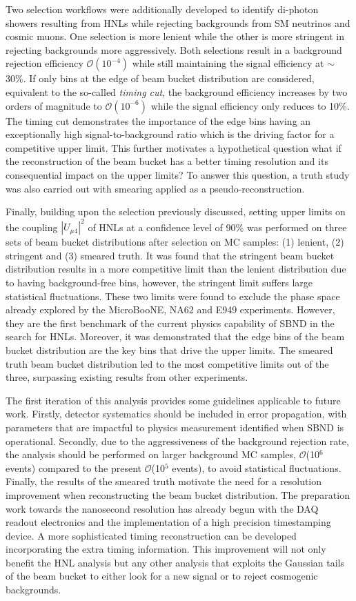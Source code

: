 Two selection workflows were additionally developed to identify di-photon showers resulting from HNLs while rejecting backgrounds from SM neutrinos and cosmic muons.
One selection is more lenient while the other is more stringent in rejecting backgrounds more aggressively.
Both selections result in a background rejection efficiency $\mathcal{O}(10^{-4})$ while still maintaining the signal efficiency at $\sim$30\%.
If only bins at the edge of beam bucket distribution are considered, equivalent to the so-called \textit{timing cut}, the background efficiency increases by two orders of magnitude to $\mathcal{O}(10^{-6})$ while the signal efficiency only reduces to 10\%. 
The timing cut demonstrates the importance of the edge bins having an exceptionally high signal-to-background ratio which is the driving factor for a competitive upper limit.
This further motivates a hypothetical question what if the reconstruction of the beam bucket has a better timing resolution and its consequential impact on the upper limits?
To answer this question, a truth study was also carried out with smearing applied as a pseudo-reconstruction. 

Finally, building upon the selection previously discussed, setting upper limits on the coupling $|U_{\mu4}|^2$ of HNLs at a confidence level of 90\% was performed on three sets of beam bucket distributions after selection on MC samples: (1) lenient, (2) stringent and (3) smeared truth.  
It was found that the stringent beam bucket distribution results in a more competitive limit than the lenient distribution due to having background-free bins, however, the stringent limit suffers large statistical fluctuations.
These two limits were found to exclude the phase space already explored by the MicroBooNE, NA62 and E949 experiments.
However, they are the first benchmark of the current physics capability of SBND in the search for HNLs.
Moreover, it was demonstrated that the edge bins of the beam bucket distribution are the key bins that drive the upper limits.   
The smeared truth beam bucket distribution led to the most competitive limits out of the three, surpassing existing results from other experiments.  

The first iteration of this analysis provides some guidelines applicable to future work.
Firstly, detector systematics should be included in error propagation, with parameters that are impactful to physics measurement identified when SBND is operational.
Secondly, due to the aggressiveness of the background rejection rate, the analysis should be performed on larger background MC samples, $\mathcal{O}$(10$^6$ events) compared to the present $\mathcal{
O}$(10$^5$ events), to avoid statistical fluctuations.
Finally, the results of the smeared truth motivate the need for a resolution improvement when reconstructing the beam bucket distribution.
The preparation work towards the nanosecond resolution has already begun with the DAQ readout electronics and the implementation of a high precision timestamping device.  
A more sophisticated timing reconstruction can be developed incorporating the extra timing information.
This improvement will not only benefit the HNL analysis but any other analysis that exploits the Gaussian tails of the beam bucket to either look for a new signal or to reject cosmogenic backgrounds.

